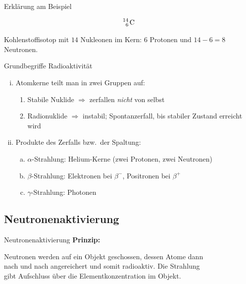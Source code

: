 \documentclass[xcolor=dvipsnames, aspectratio=169]{beamer}
\begin{document}
\begin{frame}{Erklärung am Beispiel}

{\huge\begin{equation*}
\text{\ce{^{14}_{6} C}}
\end{equation*}}\bigskip

Kohlenstoffisotop mit $14$ Nukleonen im Kern: $6$ Protonen und $14-6=8$ Neutronen.
\end{frame}

\begin{frame}[<+->]{Grundbegriffe Radioaktivität}
\begin{enumerate}[(i)]
\item Atomkerne teilt man in zwei Gruppen auf:
\begin{enumerate}[(1)]
\item Stabile Nuklide $\Rightarrow$ zerfallen \emph{nicht} von selbst
\item Radionuklide $\Rightarrow$ instabil; Spontanzerfall, bis stabiler Zustand erreicht wird
\end{enumerate}
\item Produkte des Zerfalls bzw.\ der Spaltung:
\begin{enumerate}[(a)]
\item $\alpha$-Strahlung: Helium-Kerne (zwei Protonen, zwei Neutronen)
\item $\beta$-Strahlung: Elektronen bei $\beta^-$, Positronen bei $\beta^+$
\item $\gamma$-Strahlung: Photonen
\end{enumerate}
\end{enumerate}
\end{frame}

\subsection{Neutronenaktivierung}

\begin{frame}{Neutronenaktivierung}
\textbf{Prinzip:}
\begin{center}
Neutronen werden auf ein Objekt geschossen, dessen Atome dann\\ nach und nach angereichert und somit radioaktiv. Die Strahlung\\ gibt Aufschluss über die Elementkonzentration im Objekt.
\end{center}
\end{frame}
\end{document}
